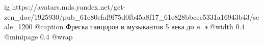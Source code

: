  
 
 
 
 

\ifcmt
  ig https://avatars.mds.yandex.net/get-zen_doc/1925930/pub_61e80efaf9f75d0fb45a8f17_61e828bbcec5331a16943b43/scale_1200
  @caption Фреска танцоров и музыкантов 5 века до н. э
  @width 0.4
  @minipage 0.4
  @wrap \parpic[r]
\fi
